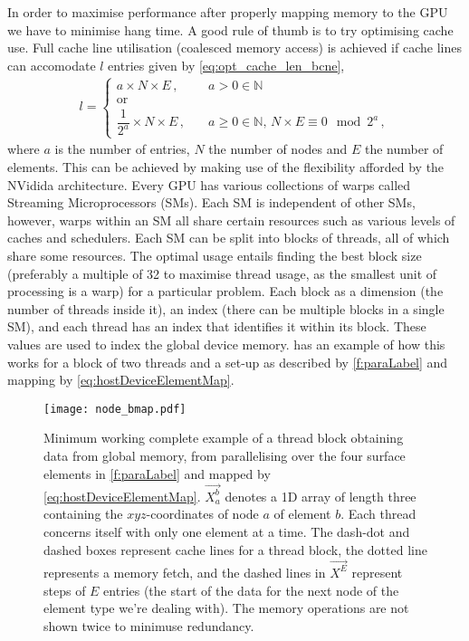 In order to maximise performance after properly mapping memory to the GPU we have to minimise hang time. A good rule of thumb is to try optimising cache use. Full cache line utilisation (coalesced memory access) is achieved if cache lines can accomodate $ l $ entries given by \cref{eq:opt_cache_len_bcne},
\begin{align}
    \label{eq:opt_cache_len_bcne}
    l =
    \begin{cases}
        a \times N \times E\,,                & \quad a > 0 \in \mathbb{N}                                          \\
        \textrm{or}                                                                                                 \\
        \dfrac{1}{2^{a}} \times N \times E\,, & \quad a \geq 0 \in \mathbb{N},\, N \times E \equiv 0 \mod{2^{a}}\,,
    \end{cases}
\end{align}
where $a$ is the number of entries, $N$ the number of nodes and $E$ the number of elements. This can be achieved by making use of the flexibility afforded by the NVidida architecture. Every GPU has various collections of warps called Streaming Microprocessors (SMs). Each SM is independent of other SMs, however, warps within an SM all share certain resources such as various levels of caches and schedulers. Each SM can be split into blocks of threads, all of which share some resources. The optimal usage entails finding the best block size (preferably a multiple of 32 to maximise thread usage, as the smallest unit of processing is a warp) for a particular problem. Each block as a dimension (the number of threads inside it), an index (there can be multiple blocks in a single SM), and each thread has an index that identifies it within its block. These values are used to index the global device memory.  has an example of how this works for a block of two threads and a set-up as described by \cref{f:paraLabel} and mapping by \cref{eq:hostDeviceElementMap}.
\begin{figure}
    \centering
    \texttt{[image: node\_bmap.pdf]}
    \caption[Sample parallel execution.]{Minimum working complete example of a thread block obtaining data from global memory, from parallelising over the four surface elements in \cref{f:paraLabel} and mapped by \cref{eq:hostDeviceElementMap}. $\vec{X_{a}^{b}}$ denotes a 1D array of length three containing the $ xyz $-coordinates of node $ a $ of element $ b $. Each thread concerns itself with only one element at a time. The dash-dot and dashed boxes represent cache lines for a thread block, the dotted line represents a memory fetch, and the dashed lines in $ \vec{X^{E}} $ represent steps of $ E $ entries (the start of the data for the next node of the element type we're dealing with). The memory operations are not shown twice to minimuse redundancy.}
    \label{f:parallel_exec}
\end{figure}

